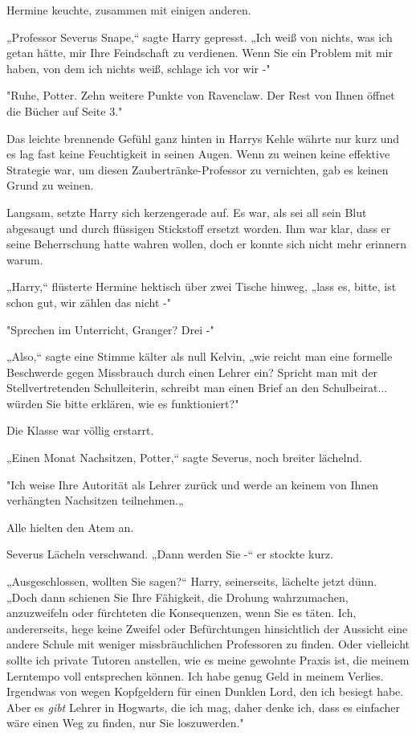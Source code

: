 {Hermine keuchte, zusammen mit einigen anderen.

„Professor Severus Snape,“ sagte Harry gepresst. „Ich weiß von nichts, was ich getan hätte, mir Ihre Feindschaft zu verdienen. Wenn Sie ein Problem mit mir haben, von dem ich nichts weiß, schlage ich vor wir -"

"Ruhe, Potter. Zehn weitere Punkte von Ravenclaw. Der Rest von Ihnen öffnet die Bücher auf Seite 3."

Das leichte brennende Gefühl ganz hinten in Harrys Kehle währte nur kurz und es lag fast keine Feuchtigkeit in seinen Augen. Wenn zu weinen keine effektive Strategie war, um diesen Zaubertränke-Professor zu vernichten, gab es keinen Grund zu weinen.

Langsam, setzte Harry sich kerzengerade auf. Es war, als sei all sein Blut abgesaugt und durch flüssigen Stickstoff ersetzt worden. Ihm war klar, dass er seine Beherrschung hatte wahren wollen, doch er konnte sich nicht mehr erinnern warum.

„Harry,“ flüsterte Hermine hektisch über zwei Tische hinweg, „lass es, bitte, ist schon gut, wir zählen das nicht -"

"Sprechen im Unterricht, Granger? Drei -"

„Also,“ sagte eine Stimme kälter als null Kelvin, „wie reicht man eine formelle Beschwerde gegen Missbrauch durch einen Lehrer ein? Spricht man mit der Stellvertretenden Schulleiterin, schreibt man einen Brief an den Schulbeirat... würden Sie bitte erklären, wie es funktioniert?"

Die Klasse war völlig erstarrt.

„Einen Monat Nachsitzen, Potter,“ sagte Severus, noch breiter lächelnd.

"Ich weise Ihre Autorität als Lehrer zurück und werde an keinem von Ihnen verhängten Nachsitzen teilnehmen.„

Alle hielten den Atem an.

Severus Lächeln verschwand. „Dann werden Sie -“ er stockte kurz.

„Ausgeschlossen, wollten Sie sagen?“ Harry, seinerseits, lächelte jetzt dünn. „Doch dann schienen Sie Ihre Fähigkeit, die Drohung wahrzumachen, anzuzweifeln oder fürchteten die Konsequenzen, wenn Sie es täten. Ich, andererseits, hege keine Zweifel oder Befürchtungen hinsichtlich der Aussicht eine andere Schule mit weniger missbräuchlichen Professoren zu finden. Oder vielleicht sollte ich private Tutoren anstellen, wie es meine gewohnte Praxis ist, die meinem Lerntempo voll entsprechen können. Ich habe genug Geld in meinem Verlies. Irgendwas von wegen Kopfgeldern für einen Dunklen Lord, den ich besiegt habe. Aber es \emph{gibt} Lehrer in Hogwarts, die ich mag, daher denke ich, dass es einfacher wäre einen Weg zu finden, nur Sie loszuwerden."

}
